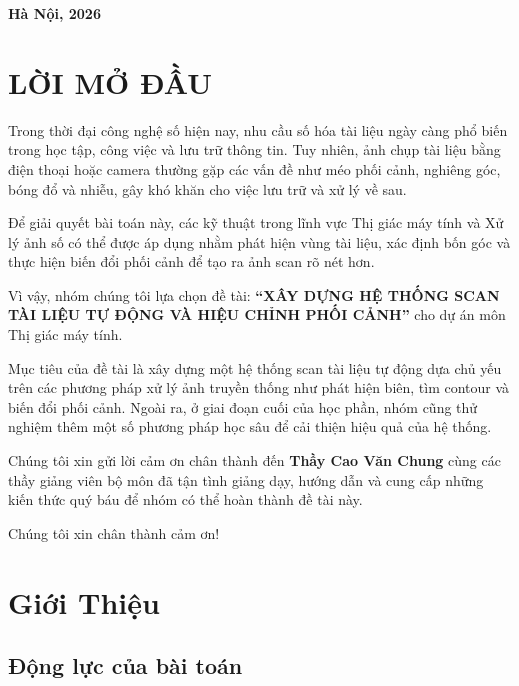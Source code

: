 \documentclass[12pt, a4paper]{report}
\begin{document}
\begin{titlepage}
\vspace{2cm}
\begin{center}
    \textbf{Hà Nội, 2026}
\end{center}
\end{titlepage}

\newpage
\thispagestyle{empty}
\null
\chapter*{LỜI MỞ ĐẦU}
\thispagestyle{empty}

Trong thời đại công nghệ số hiện nay, nhu cầu số hóa tài liệu ngày càng phổ biến trong học tập, công việc và lưu trữ thông tin. Tuy nhiên, ảnh chụp tài liệu bằng điện thoại hoặc camera thường gặp các vấn đề như méo phối cảnh, nghiêng góc, bóng đổ và nhiễu, gây khó khăn cho việc lưu trữ và xử lý về sau.

Để giải quyết bài toán này, các kỹ thuật trong lĩnh vực {Thị giác máy tính} và {Xử lý ảnh số} có thể được áp dụng nhằm phát hiện vùng tài liệu, xác định bốn góc và thực hiện biến đổi phối cảnh để tạo ra ảnh scan rõ nét hơn.

Vì vậy, nhóm chúng tôi lựa chọn đề tài: \textbf{“XÂY DỰNG HỆ THỐNG SCAN TÀI LIỆU TỰ ĐỘNG VÀ HIỆU CHỈNH PHỐI CẢNH”} cho dự án môn {Thị giác máy tính}.

Mục tiêu của đề tài là xây dựng một hệ thống scan tài liệu tự động dựa chủ yếu trên các phương pháp xử lý ảnh truyền thống như phát hiện biên, tìm contour và biến đổi phối cảnh. Ngoài ra, ở giai đoạn cuối của học phần, nhóm cũng thử nghiệm thêm một số phương pháp học sâu để cải thiện hiệu quả của hệ thống.

Chúng tôi xin gửi lời cảm ơn chân thành đến \textbf{Thầy Cao Văn Chung} cùng các thầy giảng viên bộ môn đã tận tình giảng dạy, hướng dẫn và cung cấp những kiến thức quý báu để nhóm có thể hoàn thành đề tài này.

Chúng tôi xin chân thành cảm ơn!

\newpage
\renewcommand{\contentsname}{MỤC LỤC}
\tableofcontents
\newpage


\listoffigures
\newpage

\chapter{Giới Thiệu}
\section{Động lực của bài toán}
\end{document}
